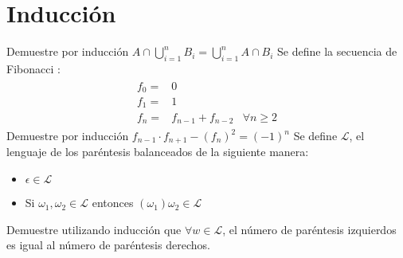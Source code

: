 \documentclass[dcc]{fcfmcourse}
\begin{document}
\section*{Inducción}
\begin{problems}
\problem Demuestre por inducción $A \cap \bigcup\limits_{i = 1}^{n}B_{i} = \bigcup\limits_{i = 1}^{n}A \cap B_{i} $
\problem Se define la secuencia de Fibonacci :
\begin{align*}
\begin{array}{llr}
        f_{0} =  & 0&\\
        f_{1} =& 1&\\
        f_{n} = & f_{n-1} + f_{n-2} & \forall n \ge 2
        \end{array}
\end{align*}
Demuestre por inducción $f_{n-1}\cdot f_{n+1} - (f_{n})^{2} = (-1)^n$
\problem Se define $\mathcal{L}$, el lenguaje de los paréntesis balanceados de la siguiente manera:
\begin{itemize}
\item $\epsilon \in \mathcal{L}$
\item Si $\omega_{1}, \omega_{2} \in \mathcal{L}$ entonces $\left(\omega_{1}\right)\omega_{2} \in \mathcal{L}$
\end{itemize}
Demuestre utilizando inducción que $\forall w \in \mathcal{L}$, el número de paréntesis izquierdos es igual al número de paréntesis derechos.

\end{problems}


\end{document}
